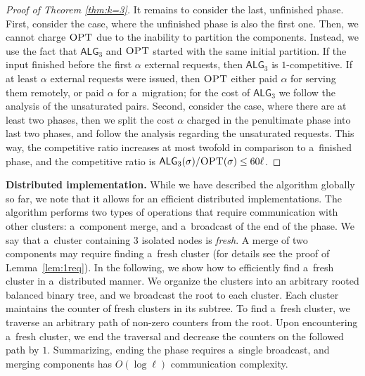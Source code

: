 \documentclass[a4paper,anonymous,USenglish]{lipics-v2019}
\newcommand{\OPT}{\textsc{OPT}\xspace}
\newcommand{\TAlg}{{\ensuremath{\textsf{ALG}_{3}}}\xspace}
\begin{document}
\begin{proof}[Proof of Theorem \ref{thm:k=3}]
	It remains to consider the last, unfinished phase.
	First, consider the case, where the unfinished phase is also the first one.
	Then, we cannot charge $\OPT$ due to the inability to partition the components.
	Instead, we use the fact that \TAlg and $\OPT$ started with the same initial partition.
	If the input finished before the first $\alpha$ external requests, then \TAlg is $1$-competitive.
	If at least $\alpha$ external requests were issued, then $\OPT$ either paid $\alpha$ for serving them remotely, or paid $\alpha$ for a~migration; for the cost of \TAlg we follow the analysis of the unsaturated pairs.
	Second, consider the case, where there are at least two phases, then we split the cost $\alpha$ charged in the penultimate phase into last two phases, and follow the analysis regarding the unsaturated requests.
	This way, the competitive ratio increases at most twofold in comparison to a~finished phase, and the competitive ratio is $\TAlg(\sigma)/\OPT(\sigma) \leq 60\ell$.
\end{proof}

\medskip
\noindent
\textbf{Distributed implementation.}
While we have described the algorithm globally so far, we note that it allows for an efficient distributed implementations. 
The algorithm performs two types of operations that require communication with other clusters: a~component merge, and a~broadcast of the end of the phase.
We say that a~cluster containing $3$ isolated nodes is \emph{fresh}.
A merge of two components may require finding a~fresh cluster (for details see the proof of Lemma~\ref{lem:1req}).
In the following, we show how to efficiently find a~fresh cluster in a~distributed manner.
We organize the clusters into an arbitrary rooted balanced binary tree, and we broadcast the root to each cluster.
Each cluster maintains the counter of fresh clusters in its subtree.
To find a~fresh cluster, we traverse an arbitrary path of non-zero counters from the root.
Upon encountering a~fresh cluster, we end the traversal and decrease the counters on the followed path by $1$.
Summarizing, ending the phase requires a~single broadcast, and merging components has $O(\log \ell)$ communication complexity.
\end{document}
